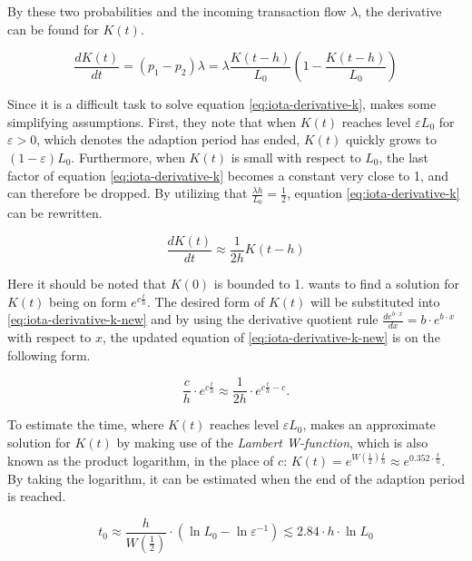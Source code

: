 By these two probabilities and the incoming transaction flow $\lambda$, the derivative can be found for $K(t)$.


\begin{equation}
\label{eq:iota-derivative-k}
\frac{dK(t)}{dt} = (p_1 - p_2)\lambda = \lambda\frac{K(t-h)}{L_0} \left( 1-\frac{K(t-h)}{L_0} \right)
\end{equation}

Since it is a difficult task to solve equation \ref{eq:iota-derivative-k}, \cite{tangle} makes some simplifying assumptions. First, they note that when $K(t)$ reaches level $\varepsilon L_0$ for $\varepsilon > 0$, which denotes the adaption period has ended, $K(t)$ quickly grows to $(1-\varepsilon)L_0$. Furthermore, when $K(t)$ is small with respect to $L_0$, the last factor of equation \ref{eq:iota-derivative-k} becomes a constant very close to 1, and can therefore be dropped. By utilizing that $\frac{\lambda h}{L_0} = \frac{1}{2}$, equation \ref{eq:iota-derivative-k} can be rewritten.

\begin{equation}
\label{eq:iota-derivative-k-new}
    \frac{dK(t)}{dt}\approx \frac{1}{2h} K(t-h)
\end{equation}

Here it should be noted that $K(0)$ is bounded to 1. \cite{tangle} wants to find a solution for $K(t)$ being on form $e^{c \frac{t}{h}}$. The desired form of $K(t)$ will be substituted into \ref{eq:iota-derivative-k-new} and by using the derivative quotient rule $\frac{de^{b \cdot x}}{dx} = b \cdot e^{b \cdot x}$ with respect to $x$, the updated equation of \ref{eq:iota-derivative-k-new} is on the following form.

\begin{equation*}
    \frac{c}{h} \cdot e^{c \frac{t}{h}} \approx \frac{1}{2h} \cdot e^{c \frac{t}{h} - c}.
\end{equation*}


To estimate the time, where $K(t)$ reaches level $\varepsilon L_0$, \cite{tangle} makes an approximate solution for $K(t)$ by making use of the \emph{Lambert W-function}, which is also known as the product logarithm, in the place of $c$: $K(t) = e^{W(\frac{1}{2}) \frac{t}{h}} \approx e^{0.352 \cdot \frac{t}{h}}$. By taking the logarithm, it can be estimated when the end of the adaption period is reached.

\begin{equation*}
    t_0 \approx \frac{h}{W(\frac{1}{2})} \cdot (\ln L_0 - \ln \varepsilon^{-1}) \lesssim 2.84 \cdot h\cdot \ln L_0
\end{equation*}

